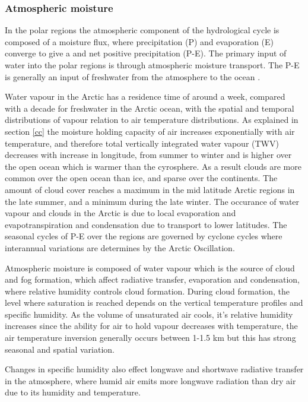 \documentclass[11pt, oneside]{article}
\begin{document}
\subsubsection{Atmospheric moisture }

In the polar regions the atmospheric component of the hydrological cycle is composed of a moisture flux, where precipitation (P) and evaporation (E) converge to give a and net positive precipitation (P-E). The primary input of water into the polar regions is through atmospheric moisture transport. The P-E is generally an input of freshwater from the atmosphere to the ocean \cite{oshima2017atmospheric}. 

Water vapour in the Arctic has a residence time of around a week, compared with a decade for freshwater in the Arctic ocean, with the spatial and temporal distributions of vapour relation to air temperature distributions. As explained in section \ref{cc} the moisture holding capacity of air increases exponentially with air temperature, and therefore total vertically integrated water vapour (TWV) decreases with increase in longitude, from summer to winter and is higher over the open ocean which is warmer than the cyrosphere. As a result clouds are more common over the open ocean than ice, and sparse over the continents. The amount of cloud cover reaches a maximum in the mid latitude Arctic regions in the late summer, and a minimum during the late winter. The occurance of water vapour and clouds in the Arctic is due to local evaporation and evapotranspiration and condensation due to transport to lower latitudes. The seasonal cycles of P-E over the regions are governed by cyclone cycles where interannual variations are determines by the Arctic Oscillation. 


Atmospheric moisture is composed of water vapour which is the source of cloud and fog formation, which affect radiative transfer, evaporation and condensation, where relative humidity controls cloud formation. During cloud formation, the level where saturation is reached depends on the vertical temperature profiles and specific humidity. As the volume of unsaturated air cools, it's relative humidity increases since the ability for air to hold vapour decreases with temperature, the air temperature inversion generally occurs between 1-1.5 km but this has strong seasonal and spatial variation. 

Changes in specific humidity also effect longwave and shortwave radiative transfer in the atmosphere, where humid air emits more longwave radiation than dry air due to its humidity and temperature. 
\end{document}
